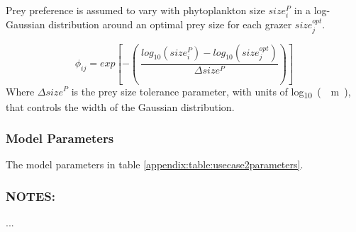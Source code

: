 \documentclass[template.tex]{subfiles}
\begin{document}
Prey preference is assumed to vary with phytoplankton size $size_i^{P}$ in a log-Gaussian distribution around an optimal prey size for each grazer $size_j^{opt}$.

\begin{equation}
    \phi_{ij} = exp \left[ -\left( \ \frac{ log_{10}(size_i^{P}) - log_{10}(size_j^{opt}) }{ \Delta size^{P} } \right) \right]
\end{equation}
Where $\Delta size^{P}$ is the prey size tolerance parameter, with units of \unit{log_{10}(\mu m)}, that controls the width of the Gaussian distribution.\\

\subsubsection{Model Parameters}
The model parameters in table \ref{appendix:table:usecase2parameters}.


\subsubsection{NOTES:}
...

\clearpage
\end{document}
